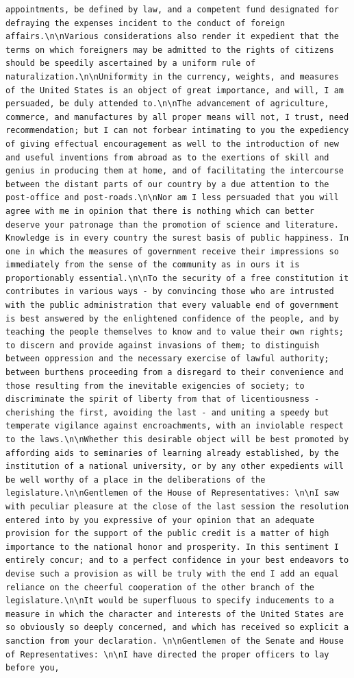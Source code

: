 \documentclass[
  letterpaper,
  DIV=11,
  numbers=noendperiod]{scrreprt}
\begin{document}
\begin{verbatim}
appointments, be defined by law, and a competent fund designated for defraying the expenses incident to the conduct of foreign affairs.\n\nVarious considerations also render it expedient that the terms on which foreigners may be admitted to the rights of citizens should be speedily ascertained by a uniform rule of naturalization.\n\nUniformity in the currency, weights, and measures of the United States is an object of great importance, and will, I am persuaded, be duly attended to.\n\nThe advancement of agriculture, commerce, and manufactures by all proper means will not, I trust, need recommendation; but I can not forbear intimating to you the expediency of giving effectual encouragement as well to the introduction of new and useful inventions from abroad as to the exertions of skill and genius in producing them at home, and of facilitating the intercourse between the distant parts of our country by a due attention to the post-office and post-roads.\n\nNor am I less persuaded that you will agree with me in opinion that there is nothing which can better deserve your patronage than the promotion of science and literature. Knowledge is in every country the surest basis of public happiness. In one in which the measures of government receive their impressions so immediately from the sense of the community as in ours it is proportionably essential.\n\nTo the security of a free constitution it contributes in various ways - by convincing those who are intrusted with the public administration that every valuable end of government is best answered by the enlightened confidence of the people, and by teaching the people themselves to know and to value their own rights; to discern and provide against invasions of them; to distinguish between oppression and the necessary exercise of lawful authority; between burthens proceeding from a disregard to their convenience and those resulting from the inevitable exigencies of society; to discriminate the spirit of liberty from that of licentiousness - cherishing the first, avoiding the last - and uniting a speedy but temperate vigilance against encroachments, with an inviolable respect to the laws.\n\nWhether this desirable object will be best promoted by affording aids to seminaries of learning already established, by the institution of a national university, or by any other expedients will be well worthy of a place in the deliberations of the legislature.\n\nGentlemen of the House of Representatives: \n\nI saw with peculiar pleasure at the close of the last session the resolution entered into by you expressive of your opinion that an adequate provision for the support of the public credit is a matter of high importance to the national honor and prosperity. In this sentiment I entirely concur; and to a perfect confidence in your best endeavors to devise such a provision as will be truly with the end I add an equal reliance on the cheerful cooperation of the other branch of the legislature.\n\nIt would be superfluous to specify inducements to a measure in which the character and interests of the United States are so obviously so deeply concerned, and which has received so explicit a sanction from your declaration. \n\nGentlemen of the Senate and House of Representatives: \n\nI have directed the proper officers to lay before you, 
\end{verbatim}
\end{document}
